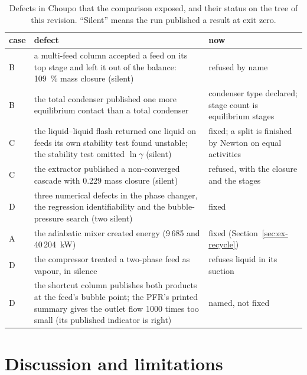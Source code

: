 \documentclass[preprint,12pt]{elsarticle}
\begin{document}
\begin{table}[t]
\centering\scriptsize
\caption{Defects in Choupo that the comparison exposed, and their status
on the tree of this revision.  ``Silent'' means the run published a result
at exit zero.}
\label{tab:benchdefects}
\begin{tabularx}{\textwidth}{@{}p{0.6cm}X p{4.8cm}@{}}
\toprule
\textbf{case} & \textbf{defect} & \textbf{now} \\
\midrule
B & a multi-feed column accepted a feed on its top stage and left it out
    of the balance: 109~\% mass closure (silent) & refused by name \\
B & the total condenser published one more equilibrium contact than a
    total condenser & condenser type declared; stage count is equilibrium
    stages \\
C & the liquid--liquid flash returned one liquid on feeds its own
    stability test found unstable; the stability test omitted
    $\ln\gamma$ (silent) & fixed; a split is finished by Newton on equal
    activities \\
C & the extractor published a non-converged cascade with 0.229 mass
    closure (silent) & refused, with the closure and the stages \\
D & three numerical defects in the phase changer, the regression
    identifiability and the bubble-pressure search (two silent) & fixed \\
A & the adiabatic mixer created energy (9\,685 and 40\,204~kW) & fixed
    (Section~\ref{sec:ex-recycle}) \\
D & the compressor treated a two-phase feed as vapour, in silence & refuses
    liquid in its suction \\
D & the shortcut column publishes both products at the feed's bubble
    point; the PFR's printed summary gives the outlet flow 1000 times too
    small (its published indicator is right) & named, not fixed \\
\bottomrule
\end{tabularx}
\end{table}

\FloatBarrier
\section{Discussion and limitations}
\label{sec:limits}
\end{document}
